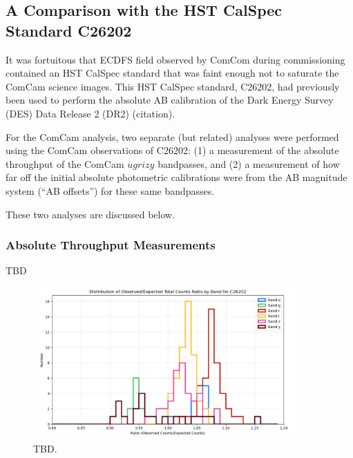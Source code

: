 \subsection{A Comparison with the HST CalSpec Standard C26202}

It was fortuitous that ECDFS field observed by ComCom during commissioning 
contained an HST CalSpec standard that was faint enough not to saturate the
ComCam science images.  This HST CalSpec standard, C26202, had previously
been used to perform the absolute AB calibration of the Dark Energy Survey 
(DES) Data Release 2 (DR2) (citation). 

For the ComCam analysis, two separate (but related) analyses were performed
using the ComCam observations of C26202:  (1) a measurement of the absolute 
throughput of the ComCam $ugrizy$ bandpasses, and (2) a measurement of how 
far off the initial absolute photometric calibrations were from the AB 
magnitude system (``AB offsets'') for these same bandpasses.

These two analyses are discussed below.

\subsubsection{Absolute Throughput Measurements}

TBD


\begin{figure}
  \begin{center}
    \includegraphics[width=0.9\textwidth]{photometric_calibration_figures/LSSTComCam_Absolute_Throughputs_20241210.png}
  \end{center}
  \caption{TBD.}
\end{figure}


